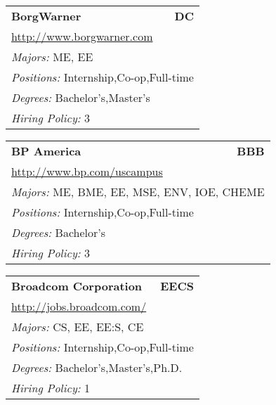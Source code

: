 \documentclass[twoside]{article}
\begin{document}
\begin{center}
\begin{multicols}{3}
\begin{FlushLeft}
\begin{minipage}{.9\columnwidth}\begin{tabularx}{.95\columnwidth}{Xr}
                 {\Large\bf BorgWarner} & {\Large\bf DC}\\
    \multicolumn{2}{p{.95\columnwidth}}{\url{http://www.borgwarner.com}}\\
    \multicolumn{2}{p{.95\columnwidth}}{\emph{Majors:} ME, EE}\\
    \multicolumn{2}{p{.95\columnwidth}}{\emph{Positions:} Internship,Co-op,Full-time}\\
    \multicolumn{2}{p{.95\columnwidth}}{\emph{Degrees:} Bachelor's,Master's}\\
    \multicolumn{2}{p{.95\columnwidth}}{\emph{Hiring Policy:} 3}\\
    \end{tabularx}
    
\end{minipage}
 
\begin{minipage}{.9\columnwidth}\begin{tabularx}{.95\columnwidth}{Xr}
                 {\Large\bf BP America} & {\Large\bf BBB}\\
    \multicolumn{2}{p{.95\columnwidth}}{\url{http://www.bp.com/uscampus}}\\
    \multicolumn{2}{p{.95\columnwidth}}{\emph{Majors:} ME, BME, EE, MSE, ENV, IOE, CHEME}\\
    \multicolumn{2}{p{.95\columnwidth}}{\emph{Positions:} Internship,Co-op,Full-time}\\
    \multicolumn{2}{p{.95\columnwidth}}{\emph{Degrees:} Bachelor's}\\
    \multicolumn{2}{p{.95\columnwidth}}{\emph{Hiring Policy:} 3}\\
    \end{tabularx}
    
\end{minipage}
 
\begin{minipage}{.9\columnwidth}\begin{tabularx}{.95\columnwidth}{Xr}
                 {\Large\bf Broadcom Corporation} & {\Large\bf EECS}\\
    \multicolumn{2}{p{.95\columnwidth}}{\url{http://jobs.broadcom.com/}}\\
    \multicolumn{2}{p{.95\columnwidth}}{\emph{Majors:} CS, EE, EE:S, CE}\\
    \multicolumn{2}{p{.95\columnwidth}}{\emph{Positions:} Internship,Co-op,Full-time}\\
    \multicolumn{2}{p{.95\columnwidth}}{\emph{Degrees:} Bachelor's,Master's,Ph.D.}\\
    \multicolumn{2}{p{.95\columnwidth}}{\emph{Hiring Policy:} 1}\\
    \end{tabularx}
    

\end{minipage}
\end{FlushLeft}
\end{multicols}
\end{center}
\end{document}
